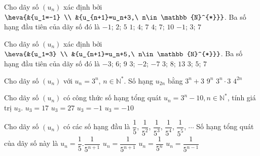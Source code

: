 \begin{ex}%
	Cho dãy số $\left(u_n \right)$ xác định  bởi $\heva{&{u_1=-1} \\
	 &{u_{n+1}=u_n+3,\ n\in\mathbb{N}^{*}}}$. Ba số hạng đầu tiên của dãy số đó là
	\choice 
		 {\True $-1$; $2$; $5$}
		{$1$;  $4$; $7$}
		{$4$; $7$;  $10$}
		 {$-1$; $3$; $7$}
\end{ex}

\begin{ex}%
	 Cho dãy số $\left(u_n \right)$ xác định bởi $\heva{&{u_1=3} \\
	&{u_{n+1}=u_n+5,\ n\in\mathbb{N}^{*}}}$.  Ba số hạng đầu tiên của dãy số đó là
	\choice 
		{$-3$; $6$;  $9$}
		{$3$; $-2$;  $-7$}
		{\True  $3$; $8$; $13$}
		{$3$;  $5$; $7$}
\end{ex}

\begin{ex}%
	Cho dãy số $\left(u_n \right)$ với $u_n=3^n$, $n\in \mathbb{N}^{*}$. Số hạng  $u_{2n}$ bằng
	\choice 
		 {$3^n+3$}
		 {\True $9^n$}
		 {$3^n\cdot3$}
		{$4^{2n}$} 
\end{ex}

\begin{ex}%
	Cho dãy số $(u_n)$ có công thức số hạng tổng  quát $u_n=3^n-10,n\in{\mathbb{N}^{*}}$, tính giá trị $u_3$.
	 \choice
		{\True $u_3=17$} 
		 {$u_3=27$}
		 {$u_3=-1$}
		 {$u_3=-10$}
\end{ex}

\begin{ex}%
	Cho dãy  số $\left(u_n\right)$ có các số hạng đầu là $\dfrac{1}{5}$, $\dfrac{1}{5^2}$, $\dfrac{1}{5^3}$, $\dfrac{1}{5^4}$, $\dfrac{1}{5^5}$, $\cdots $ Số hạng tổng quát của dãy số này là
	 \choice
		 {$u_n=\dfrac{1}{5}.\dfrac{1}{5^{n+1}}$}
		 {$u_n=\dfrac{1}{5^{n+1}}$}
		 {\True $u_n=\dfrac{1}{5^n}$}
		 {$u_n=\dfrac{1}{5^{n-1}}$}
\end{ex}

